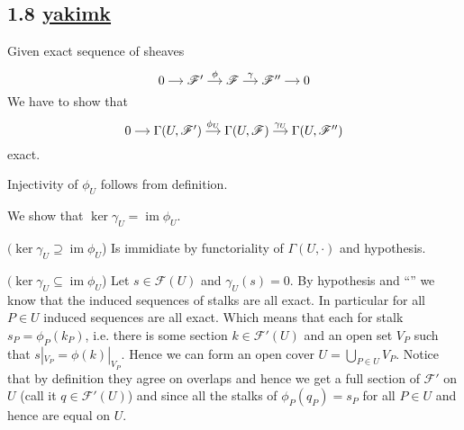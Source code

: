     \subsection*{1.8   \href{https://github.com/yakimk}{yakimk}
}


Given exact sequence of sheaves 
\[
\begin{tikzcd}[cramped, sep=small] 0 \arrow[r] & \mathscr{F'} \arrow[r, "\phi"] & \mathscr{F} \arrow[r, "\gamma"] & \mathscr{F''} \arrow[r] & 0 \end{tikzcd}
\]
We have to show that 
\[
\begin{tikzcd}[cramped, sep=small] 0 \arrow[r] & \Gamma(U, \mathscr{F'}) \arrow[r, "\phi_U"] & \Gamma(U,\mathscr{F}) \arrow[r, "\gamma_U"] & \Gamma(U, \mathscr{F''})  \end{tikzcd}
\]
exact.

Injectivity of $\phi_{U}$ follows from definition.

We show that $\ker\gamma_{U} = \operatorname{im} \phi_{U}$.

$(\ker\gamma_{U}  \supseteq \operatorname{im} \phi_{U}$) Is immidiate by functoriality of $\Gamma(U, \cdot )$ and hypothesis.

$(\ker\gamma_{U} \subseteq  \operatorname{im} \phi_{U}$) Let $s \in \mathscr{F}(U)$ and $\gamma_{U}(s) = 0$. By hypothesis and “” we know that the induced sequences of stalks are all exact. In particular for all $P \in U$ induced sequences are all exact. Which means that each for stalk $s_{P} = \phi_{P}(k_{P})$, i.e. there is some section $k \in \mathscr{F'}(U)$ and an open set $V_{P}$ such that $s|_{V_{P}}=\phi(k)|_{V_{P}}$. Hence we can form an open cover $U = \bigcup_{P \in U} V_P$. Notice that by definition they agree on overlaps and hence we get a full section of $\mathscr{F'}$ on $U$ (call it $q \in \mathscr{F'}(U)$) and since all the stalks of $\phi_{P}(q_{P}) = s_{P}$ for all $P \in U$ and hence are equal on $U$.

